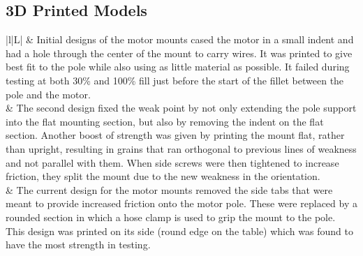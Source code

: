 \newpage

\subsection{3D Printed Models}
\label{sec:print}
\begin{table}[!htbp]
	\centering
	\caption{Modelling iterations for motor mounts}
	\begin{tabulary}{\textwidth}{|l|L|}
		\hline 
		\centering
		 &
		\vspace{40pt} Initial designs of the motor mounts cased the motor in a small indent and had a hole through the center of the mount to carry wires. It was printed to give best fit to the pole while also using as little material as possible.
		It failed during testing at both 30\% and 100\% fill just before the start of the fillet between the pole and the motor. \\ 
		\hline 
		\centering
		 &
		\vspace{40pt} The second design fixed the weak point by not only extending the pole support into the flat mounting section, but also by removing the indent on the flat section.
		Another boost of strength was given by printing the mount flat, rather than upright, resulting in grains that ran orthogonal to previous lines of weakness and not parallel with them.
		When side screws were then tightened to increase friction, they split the mount due to the new weakness in the orientation. \\ 
		\hline 
		\centering
		 &
		\vspace{40pt} The current design for the motor mounts removed the side tabs that were meant to provide increased friction onto the motor pole. These were replaced by a rounded section in which a hose clamp is used to grip the mount to the pole. This design was printed on its side (round edge on the table) which was found to have the most strength in testing.\\ 
		\hline
	\end{tabulary} 
	\label{tab:3D_motor}
\end{table}

\newpage

